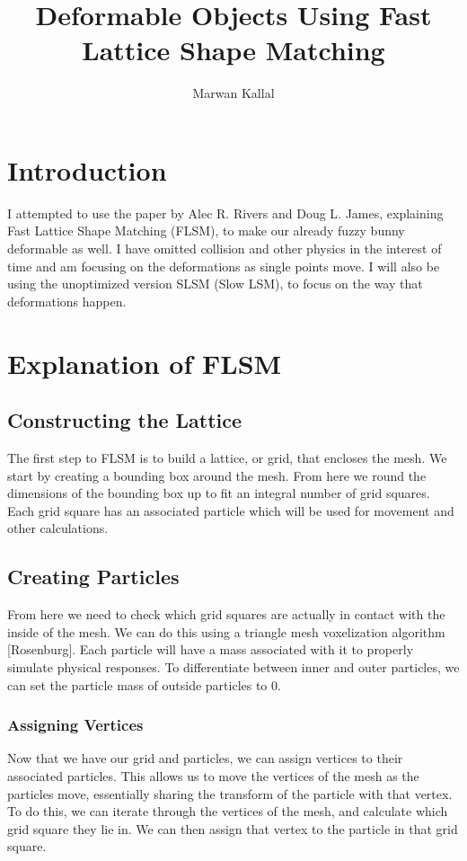 \documentclass[12pt,a4paper]{article}
\begin{document}
	\title{Deformable Objects Using Fast Lattice Shape Matching}
	\author{Marwan Kallal}
	\date{}
	\maketitle
	
	\section{Introduction}
	I attempted to use the paper by Alec R. Rivers and Doug L. James, explaining Fast Lattice Shape Matching (FLSM), to make our already fuzzy bunny deformable as well. I have omitted collision and other physics in the interest of time and am focusing on the deformations as single points move. I will also be using the unoptimized version SLSM (Slow LSM), to focus on the way that deformations happen.
	
	\section{Explanation of FLSM}
	\subsection{Constructing the Lattice}
	The first step to FLSM is to build a lattice, or grid, that encloses the mesh. We start by creating a bounding box around the mesh. From here we round the dimensions of the bounding box up to fit an integral number of grid squares. Each grid square has an associated particle which will be used for movement and other calculations.  
	
	\subsection{Creating Particles}
	From here we need to check which grid squares are actually in contact with the inside of the mesh. We can do this using a triangle mesh voxelization algorithm [Rosenburg]. Each particle will have a mass associated with it to properly simulate physical responses. To differentiate between inner and outer particles, we can set the particle mass of outside particles to 0.
	
	\subsubsection{Assigning Vertices}
	Now that we have our grid and particles, we can assign vertices to their associated particles. This allows us to move the vertices of the mesh as the particles move, essentially sharing the transform of the particle with that vertex. To do this, we can iterate through the vertices of the mesh, and calculate which grid square they lie in. We can then assign that vertex to the particle in that grid square.
	
\end{document}
